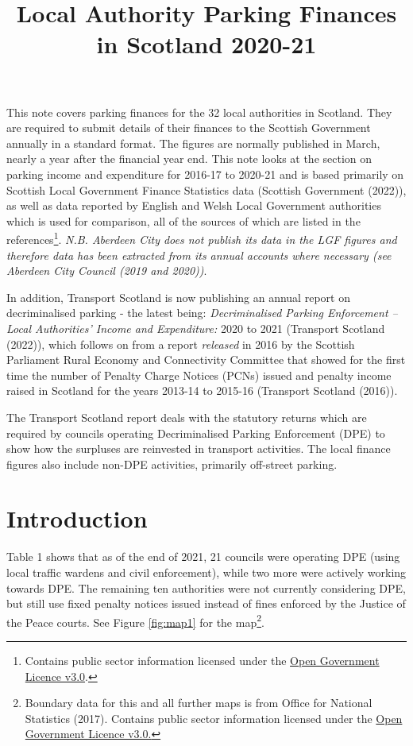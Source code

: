 \documentclass[
  12pt,
]{article}
\title{Local Authority Parking Finances in Scotland 2020-21}
\author{}
\date{\vspace{-2.5em}}
\begin{document}
\maketitle

\renewcommand{\arraystretch}{1.2}

This note covers parking finances for the 32 local authorities in Scotland. They are required to submit details of their finances to the Scottish Government annually in a standard format. The figures are normally published in March, nearly a year after the financial year end. This note looks at the section on parking income and expenditure for 2016-17 to 2020-21 and is based primarily on Scottish Local Government Finance Statistics data (Scottish Government (2022)), as well as data reported by English and Welsh Local Government authorities which is used for comparison, all of the sources of which are listed in the references\footnote{Contains public sector information licensed under the \href{http://www.nationalarchives.gov.uk/doc/open-government-licence/version/3/}{Open Government Licence v3.0}.}. \emph{N.B. Aberdeen City does not publish its data in the LGF figures and therefore data has been extracted from its annual accounts where necessary (see Aberdeen City Council (2019 and 2020))}.

In addition, Transport Scotland is now publishing an annual report on decriminalised parking - the latest being: \emph{Decriminalised Parking Enforcement -- Local Authorities' Income and Expenditure:} 2020 to 2021 (Transport Scotland (2022)), which follows on from a report \emph{released} in 2016 by the Scottish Parliament Rural Economy and Connectivity Committee that showed for the first time the number of Penalty Charge Notices (PCNs) issued and penalty income raised in Scotland for the years 2013-14 to 2015-16 (Transport Scotland (2016)).

The Transport Scotland report deals with the statutory returns which are required by councils operating Decriminalised Parking Enforcement (DPE) to show how the surpluses are reinvested in transport activities. The local finance figures also include non-DPE activities, primarily off-street parking.

\hypertarget{introduction}{%
\section{Introduction}\label{introduction}}

Table 1 shows that as of the end of 2021, 21 councils were operating DPE (using local traffic wardens and civil enforcement), while two more were actively working towards DPE. The remaining ten authorities were not currently considering DPE, but still use fixed penalty notices issued instead of fines enforced by the Justice of the Peace courts. See Figure \ref{fig:map1} for the map\footnote{Boundary data for this and all further maps is from Office for National Statistics (2017). Contains public sector information licensed under the \href{http://www.nationalarchives.gov.uk/doc/open-government-licence/version/3/}{Open Government Licence v3.0.}}.
\end{document}
